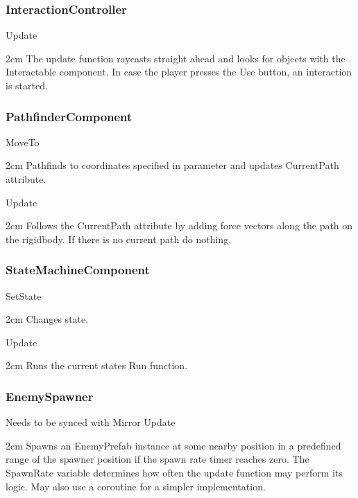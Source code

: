 \documentclass[11pt]{article}
\newenvironment{indentall}{\begin{adjustwidth}{2cm}{}}{\end{adjustwidth}}
\begin{document}
\subsubsection{InteractionController}
Update
\begin{indentall}
The update function raycasts straight ahead and looks for objects with the Interactable component. In case the player presses the Use button, an interaction is started.
\end{indentall}

\subsubsection{PathfinderComponent}
MoveTo
\begin{indentall}
Pathfinds to coordinates specified in parameter and updates CurrentPath attribute.
\end{indentall}
Update
\begin{indentall}
Follows the CurrentPath attribute by adding force vectors along the path on the rigidbody. If there is no current path do nothing.
\end{indentall}

\subsubsection{StateMachineComponent}
SetState
\begin{indentall}
Changes state.
\end{indentall}
Update
\begin{indentall}
Runs the current states Run function.
\end{indentall}

\subsubsection{EnemySpawner}
Needs to be synced with Mirror
\newline
\newline Update
\begin{indentall}
Spawns an EnemyPrefab instance at some nearby position in a predefined range of the spawner position if the spawn rate timer reaches zero. The SpawnRate variable determines how often the update function may perform its logic. May also use a coroutine for a simpler implementation.
\end{indentall}
\end{document}

